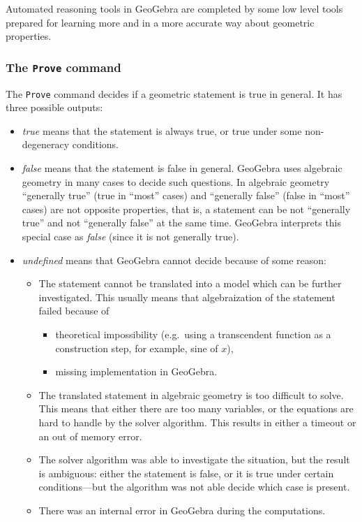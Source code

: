 \documentclass{article}
\begin{document}
Automated reasoning tools in GeoGebra are completed by some low level tools prepared for learning more and in a more accurate way about geometric properties.

\subsubsection{The \texttt{Prove} command}
The \texttt{Prove} command decides if a geometric statement is true in general. It has three possible outputs:
\begin{itemize}
    \item \textit{true} means that the statement is always true, or true under some non-degeneracy conditions.
    \item \textit{false} means that the statement is false in general. GeoGebra uses algebraic geometry in many cases to decide such questions. In algebraic geometry ``generally true'' (true in ``most'' cases) and ``generally false'' (false in ``most'' cases) are not opposite properties, that is, a statement can be not ``generally true'' and not ``generally false'' at the same time. GeoGebra interprets this special case as \textit{false} (since it is not generally true).
    \item \textit{undefined} means that GeoGebra cannot decide because of some reason:
    \begin{itemize}
        \item The statement cannot be translated into a model which can be further investigated. This usually means that algebraization of the statement failed because of 
        \begin{itemize}
            \item theoretical impossibility (e.g.~using a transcendent function as a construction step, for example, sine of $x$),
            \item missing implementation in GeoGebra.
        \end{itemize}
        \item The translated statement in algebraic geometry is too difficult to solve. This means that either there are too many variables, or the equations are hard to handle by the solver algorithm. This results in either a timeout or an out of memory error.
        \item The solver algorithm was able to investigate the situation, but the result is ambiguous: either the statement is false, or it is true under certain conditions---but the algorithm was not able decide which case is present.
        \item There was an internal error in GeoGebra during the computations.
    \end{itemize}
\end{itemize}
\end{document}
